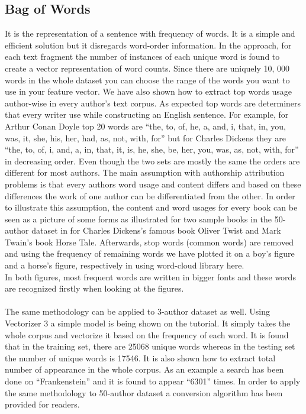 \subsection{Bag of Words}
It is the representation of a sentence with frequency of words. It is a simple and efficient solution but it disregards word-order information.
In the approach, for each text fragment the number of instances of each unique word is found to create a vector representation of word counts. Since there are uniquely 10, 000 words in the whole dataset you can choose the range of the words you want to use in your feature vector. We have also shown how to extract top words usage author-wise in every author’s text corpus.
As expected top words are determiners that every writer use while constructing an English sentence. For example, for Arthur Conan Doyle top 20 words are “the, to, of, he, a, and, i, that, in, you, was, it, she, his, her, had, as, not, with, for” but for Charles Dickens they are “the, to, of, i, and, a, in, that, it, is, he, she, be, her, you, was, as, not, with, for” in decreasing order. Even though the two sets are mostly the same the orders are different for most authors.
The main assumption with authorship attribution problems is that every authors word usage and content differs and based on these differences the work of one author can be differentiated from the other. In order to illustrate this assumption, the content and word usages for every book can be seen as a picture of some forms as illustrated for two sample books in the 50-author dataset in for Charles Dickens’s famous book Oliver Twist and Mark Twain’s book Horse Tale. Afterwards, stop words (common words) are removed and using the frequency of remaining words we have plotted it on a boy’s figure and a horse’s figure, respectively in using word-cloud library here.\\
In both figures, most frequent words are written in bigger fonts and these words are recognized firstly when looking at the figures.\\\\

The same methodology can be applied to 3-author dataset as well. Using Vectorizer 3 a simple model is being shown on the tutorial. It simply takes the whole corpus and vectorize it based on the frequency of each word. It is found that in the training set, there are 25068 unique words whereas in the testing set the number of unique words is 17546. It is also shown how to extract total number of appearance in the whole corpus. As an example a search has been done on “Frankenstein” and it is found to appear “6301” times. In order to apply the same methodology to 50-author dataset a conversion algorithm has been provided for readers.

